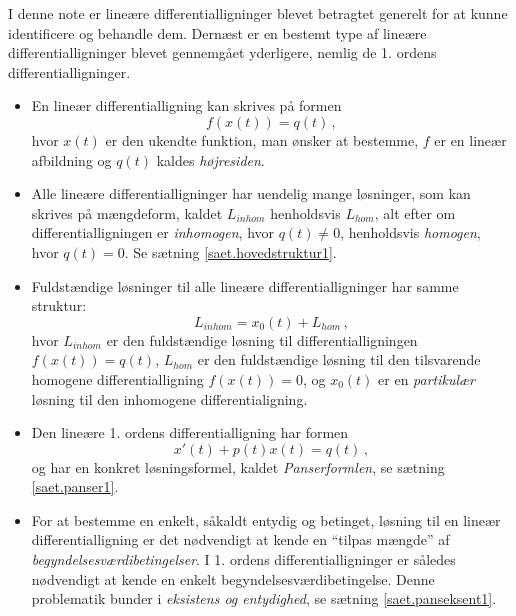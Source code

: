 \begin{summary}
I denne note er lineære differentialligninger blevet betragtet generelt for at kunne identificere og behandle dem. Dernæst er en bestemt type af lineære differentialligninger blevet gennemgået yderligere, nemlig de 1. ordens differentialligninger.

\begin{itemize}
\item En lineær differentialligning kan skrives på formen
\begin{equation}
f(x(t)) = q(t) \, ,
\end{equation}
hvor $ x(t) $ er den ukendte funktion, man ønsker at bestemme, $ f $ er en lineær afbildning og $ q(t) $ kaldes \textit{højresiden}.
\item Alle lineære differentialligninger har uendelig mange løsninger, som kan skrives på mængdeform, kaldet $ L_{inhom} $ henholdsvis $ L_{hom} $, alt efter om differentialligningen er \textit{inhomogen}, hvor $ q(t) \neq 0 $, henholdsvis \textit{homogen}, hvor $ q(t) = 0 $. Se sætning \ref{saet.hovedstruktur1}.
\item Fuldstændige løsninger til alle lineære differentialligninger har samme struktur:
\begin{equation}
L_{inhom} = x_0(t) + L_{hom} \, ,
\end{equation}
hvor $ L_{inhom} $ er den fuldstændige løsning til differentialligningen $ f(x(t)) = q(t) $, $ L_{hom} $ er den fuldstændige løsning til den tilsvarende homogene differentialligning $ f(x(t)) = 0 $, og $ x_0(t) $ er en \textit{partikulær} løsning til den inhomogene differentialigning.
\item Den lineære 1. ordens differentialligning har formen
\begin{equation}
x'(t) + p(t)x(t) = q(t) \, ,
\end{equation}
og har en konkret løsningsformel, kaldet \textit{Panserformlen}, se sætning \ref{saet.panser1}.
\item For at bestemme en enkelt, såkaldt entydig og betinget, løsning til en lineær differentialligning er det nødvendigt at kende en ``tilpas mængde'' af \textit{begyndelsesværdibetingelser}. I 1. ordens differentialligninger er således nødvendigt at kende en enkelt begyndelsesværdibetingelse. Denne problematik bunder i \textit{eksistens og entydighed}, se sætning \ref{saet.panseksent1}.
\end{itemize}

\end{summary}


